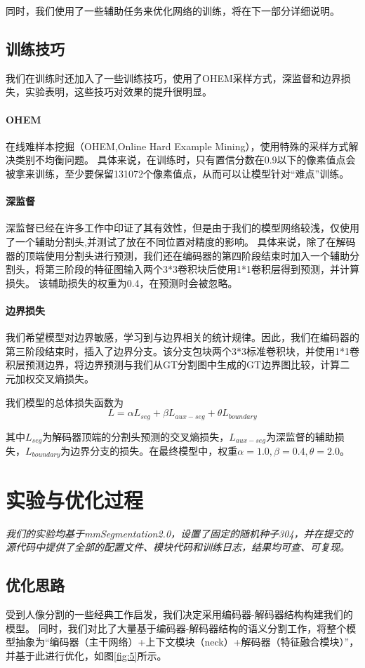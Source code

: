 \documentclass[11pt]{article}
\begin{document}
同时，我们使用了一些辅助任务来优化网络的训练，将在下一部分详细说明。
\subsection{训练技巧}
我们在训练时还加入了一些训练技巧，使用了OHEM采样方式，深监督和边界损失，实验表明，这些技巧对效果的提升很明显。
\paragraph{OHEM}在线难样本挖掘（OHEM,Online Hard Example Mining），使用特殊的采样方式解决类别不均衡问题。
具体来说，在训练时，只有置信分数在0.9以下的像素值点会被拿来训练，至少要保留131072个像素值点，从而可以让模型针对“难点”训练。

\paragraph{深监督}深监督已经在许多工作中印证了其有效性，但是由于我们的模型网络较浅，仅使用了一个辅助分割头,并测试了放在不同位置对精度的影响。
具体来说，除了在解码器的顶端使用分割头进行预测，我们还在编码器的第四阶段结束时加入一个辅助分割头，将第三阶段的特征图输入两个3*3卷积块后使用1*1卷积层得到预测，并计算损失。
该辅助损失的权重为0.4，在预测时会被忽略。

\paragraph{边界损失}
我们希望模型对边界敏感，学习到与边界相关的统计规律。因此，我们在编码器的第三阶段结束时，插入了边界分支。该分支包块两个3*3标准卷积块，并使用1*1卷积层预测边界，将边界预测与我们从GT分割图中生成的GT边界图比较，计算二元加权交叉熵损失。

我们模型的总体损失函数为
\[L=\alpha L_{seg} + \beta L_{aux-seg}+\theta L_{boundary}\]

其中$L_{seg}$为解码器顶端的分割头预测的交叉熵损失，$L_{aux-seg}$为深监督的辅助损失，$L_{boundary}$为边界分支的损失。在最终模型中，权重$\alpha=1.0, \beta=0.4,\theta=2.0$。
\section{实验与优化过程}
\textit{我们的实验均基于mmSegmentation2.0，设置了固定的随机种子304，并在提交的源代码中提供了全部的配置文件、模块代码和训练日志，结果均可查、可复现。}
\subsection{优化思路}
受到人像分割的一些经典工作启发\cite{porn,ref42,ref43}，我们决定采用编码器-解码器结构构建我们的模型。
同时，我们对比了大量基于编码器-解码器结构的语义分割工作，将整个模型抽象为“编码器（主干网络）+上下文模块（neck）+解码器（特征融合模块）”，并基于此进行优化，如图\ref{fig:5}所示。
\end{document}

